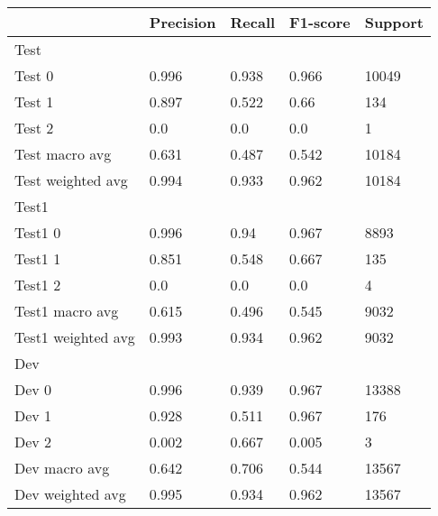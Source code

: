 \begin{tabular}{lllll}
\toprule
{} & Precision & Recall & F1-score & Support \\
\midrule
Test               &           &        &          &         \\
Test 0             &     0.996 &  0.938 &    0.966 &   10049 \\
Test 1             &     0.897 &  0.522 &     0.66 &     134 \\
Test 2             &       0.0 &    0.0 &      0.0 &       1 \\
Test macro avg     &     0.631 &  0.487 &    0.542 &   10184 \\
Test weighted avg  &     0.994 &  0.933 &    0.962 &   10184 \\
Test1              &           &        &          &         \\
Test1 0            &     0.996 &   0.94 &    0.967 &    8893 \\
Test1 1            &     0.851 &  0.548 &    0.667 &     135 \\
Test1 2            &       0.0 &    0.0 &      0.0 &       4 \\
Test1 macro avg    &     0.615 &  0.496 &    0.545 &    9032 \\
Test1 weighted avg &     0.993 &  0.934 &    0.962 &    9032 \\
Dev                &           &        &          &         \\
Dev 0              &     0.996 &  0.939 &    0.967 &   13388 \\
Dev 1              &     0.928 &  0.511 &    0.967 &     176 \\
Dev 2              &     0.002 &  0.667 &    0.005 &       3 \\
Dev macro avg      &     0.642 &  0.706 &    0.544 &   13567 \\
Dev weighted avg   &     0.995 &  0.934 &    0.962 &   13567 \\
\bottomrule
\end{tabular}
